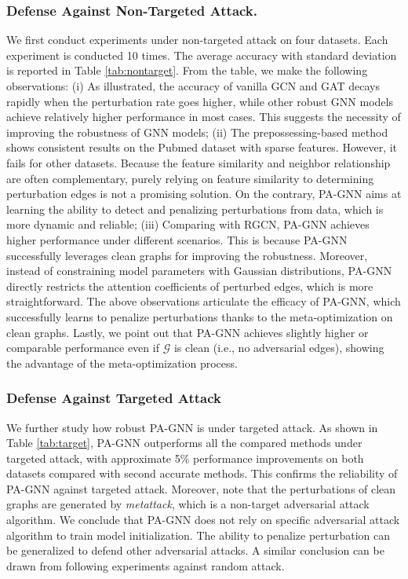 \documentclass[sigconf]{acmart}
\newcommand{\our}{{PA-GNN}\xspace}
\newcommand{\ours}{{PA-GNN}\xspace}
\def \G {\mathcal{G}}
\begin{document}
\subsubsection{Defense Against Non-Targeted Attack.}
We first conduct experiments under non-targeted attack on four datasets. Each experiment is conducted 10 times. The average accuracy with standard deviation is reported in Table \ref{tab:nontarget}. From the table, we make the following observations: (i) As illustrated, the accuracy of vanilla GCN and GAT decays rapidly when the perturbation rate goes higher, while other robust GNN models achieve relatively higher performance in most cases. This suggests the necessity of improving the robustness of GNN models; (ii) The prepossessing-based method shows consistent results on the Pubmed dataset with sparse features. However, it fails for other datasets. Because the feature similarity and neighbor relationship are often complementary, purely relying on feature similarity to determining perturbation edges is not a promising solution. On the contrary, \our aims at learning the ability to detect and penalizing perturbations from data, which is more dynamic and reliable;
(iii) Comparing with RGCN, \our achieves higher performance under different scenarios. This is because \our successfully leverages clean graphs for improving the robustness. Moreover, instead of constraining model parameters with Gaussian distributions, \our directly restricts the attention coefficients of perturbed edges, which is more straightforward. The above observations articulate the efficacy of \ours, which successfully learns to penalize perturbations thanks to the meta-optimization on clean graphs. Lastly, we point out that \ours achieves slightly higher or comparable performance even if $\G$ is clean (i.e., no adversarial edges), showing the advantage of the meta-optimization process.





\subsubsection{Defense Against Targeted Attack}
We further study how robust \our is under targeted attack.
As shown in Table \ref{tab:target}, \our outperforms all the compared methods under targeted attack, with approximate 5\% performance improvements on both datasets compared with second accurate methods.
This confirms the reliability of \our against targeted attack.
Moreover, note that the perturbations of clean graphs are generated by \textit{metattack}, which is a non-target adversarial attack algorithm. We conclude that \ours does not rely on specific adversarial attack algorithm to train model initialization. The ability to penalize perturbation can be generalized to defend other adversarial attacks. A similar conclusion can be drawn from following experiments against random attack.
\end{document}

